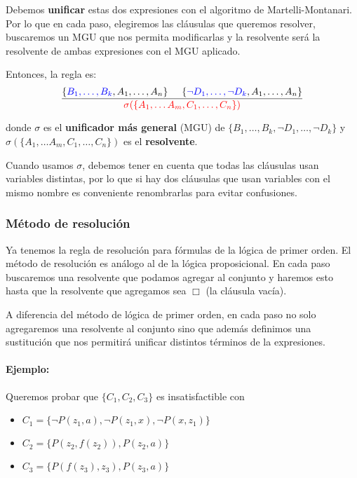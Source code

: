 Debemos \textbf{unificar} estas dos expresiones con el algoritmo de Martelli-Montanari. Por lo que en cada paso, elegiremos las cláusulas que queremos resolver, buscaremos un MGU que nos permita modificarlas y la resolvente será la resolvente de ambas expresiones con el MGU aplicado.

Entonces, la regla es:
$$\frac{\{\color{blue}B_1,\dots,B_k\color{black},A_1,\dots,A_n\}\hspace*{5mm}\{\color{blue}\lnot D_1,\dots,\lnot D_k\color{black},A_1,\dots,A_n\}}{{\color{red}\sigma(\{A_1,\dots A_m, C_1,\dots,C_n\})}}$$

donde $\sigma$ es el \textbf{unificador más general} (MGU) de $\{B_1,\dots,B_k,\lnot D_1,\dots,\lnot D_k\}$ y \\ $\sigma(\{A_1,\dots A_m, C_1,\dots,C_n\})$ es el \textbf{resolvente}.

Cuando usamos $\sigma$, debemos tener en cuenta que todas las cláusulas usan variables distintas, por lo que si hay dos cláusulas que usan variables con el mismo nombre es conveniente renombrarlas para evitar confusiones.

\subsubsection{Método de resolución}

Ya tenemos la regla de resolución para fórmulas de la lógica de primer orden. El método de resolución es análogo al de la lógica proposicional. En cada paso buscaremos una resolvente que podamos agregar al conjunto y haremos esto hasta que la resolvente que agregamos sea $\Box$ (la cláusula vacía).

A diferencia del método de lógica de primer orden, en cada paso no solo agregaremos una resolvente al conjunto sino que además definimos una sustitución que nos permitirá unificar distintos términos de la expresiones.

\paragraph{Ejemplo:} Queremos probar que $\{C_1, C_2, C_3\}$ es insatisfactible con
\begin{itemize}
\item $C_1 = \{\lnot P(z_1,a), \lnot P(z_1,x), \lnot P(x,z_1)\}$
\item $C_2 = \{P(z_2,f(z_2)), P(z_2,a)\}$
\item $C_3 = \{P(f(z_3),z_3), P(z_3,a)\}$
\end{itemize}

